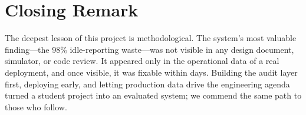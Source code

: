\section{Closing Remark}
The deepest lesson of this project is methodological. The system's most
valuable finding---the 98\% idle-reporting waste---was not visible in
any design document, simulator, or code review. It appeared only in the
operational data of a real deployment, and once visible, it was fixable
within days. Building the audit layer first, deploying early, and
letting production data drive the engineering agenda turned a student
project into an evaluated system; we commend the same path to those who
follow.
